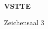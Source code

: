 \documentclass[a4paper]{article}
\begin{document}
\printGenericVSLHeader
\begin{center}
\begin{vsltext}{3cm}{4cm}

   \vspace{0.5cm} 

    \textbf{VSTTE} 

    \vspace{1.5cm}

    Zeichensaal 3

\end{vsltext}

\end{center}
\end{document}
